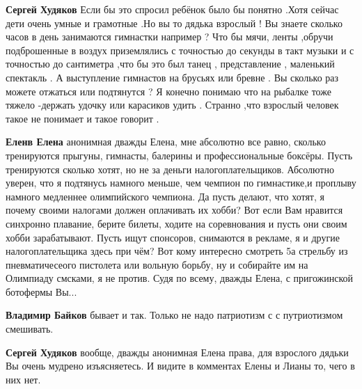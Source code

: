 \begin{itemize}
\begin{itemize}
\textbf{Сергей Худяков} Если бы это спросил ребёнок было бы понятно .Хотя
сейчас дети очень умные и грамотные .Но вы то дядька взрослый ! Вы знаете
сколько часов в день занимаются гимнастки например ? Что бы мячи, ленты ,обручи
подброшенные в воздух приземлялись с точностью до секунды в такт музыки и с
точностью до сантиметра ,что бы это был танец , представление , маленький
спектакль . А выступление гимнастов на брусьях или бревне . Вы сколько раз
можете отжаться или подтянутся ? Я конечно понимаю что на рыбалке тоже тяжело
-держать удочку или карасиков удить . Странно ,что взрослый человек такое не
понимает и такое говорит .

 
\textbf{Еленв Елена} анонимная дважды Елена, мне абсолютно все равно, сколько
тренируются прыгуны, гимнасты, балерины и профессиональные боксёры. Пусть
тренируются сколько хотят, но не за деньги налогоплательщиков. Абсолютно
уверен, что я подтянусь намного меньше, чем чемпион по гимнастике,и проплыву
намного медленнее олимпийского чемпиона. Да пусть делают, что хотят, я почему
своими налогами должен оплачивать их хобби? Вот если Вам нравится синхронно
плавание, берите билеты, ходите на соревнования и пусть они своим хобби
зарабатывают. Пусть ищут спонсоров, снимаются в рекламе, я и другие
налогоплательщика здесь при чём? Вот кому интересно смотреть 5а стрельбу из
пневматичесеого пистолета или вольную борьбу, ну и собирайте им на Олимпиаду
смсками, я не против. Судя по всему, дважды Елена, с пригожинской ботофермы
Вы...

 
\textbf{Владимир Байков} бывает и так. Только не надо патриотизм с с путриотизмом смешивать.

 
\textbf{Сергей Худяков} вообще, дважды анонимная Елена права, для взрослого
дядьки Вы очень мудрено изъясняетесь. И видите в комментах Елены и Лианы то,
чего в них нет.


\end{itemize}
\end{itemize}
